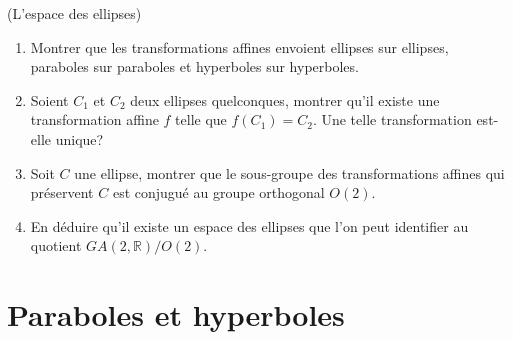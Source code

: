 \documentclass[a4paper,12pt,reqno]{amsart}
\begin{document}
\begin{exo} (L'espace des ellipses)

  \begin{enumerate}
    \item Montrer que les transformations affines envoient ellipses sur ellipses, paraboles sur paraboles et hyperboles sur hyperboles.
    \item Soient $C_1$ et $C_2$ deux ellipses quelconques, montrer qu'il existe une transformation affine $f$ telle que $f(C_1)=C_2$. Une telle transformation est-elle unique?
    \item Soit $C$ une ellipse, montrer que le sous-groupe des transformations affines qui préservent $C$ est conjugué au groupe orthogonal $O(2)$.
    \item\hard En déduire qu'il existe un espace des ellipses que l'on peut identifier au quotient $GA(2, \mathbb{R})/O(2)$.
  \end{enumerate}

\end{exo}


\section{Paraboles et hyperboles}
\end{document}
